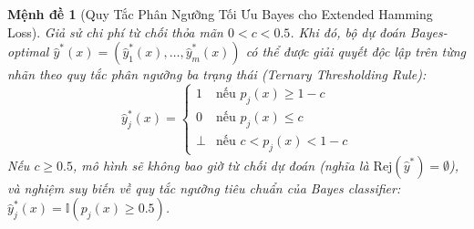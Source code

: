 \documentclass[11pt,a4paper]{article}
\newtheorem{proposition}{Mệnh đề}[section]
\begin{document}
\begin{proposition}[Quy Tắc Phân Ngưỡng Tối Ưu Bayes cho Extended Hamming Loss]
\label{prop:bop_hamming_sep}
Giả sử chi phí từ chối thỏa mãn $0 < c < 0.5$. Khi đó, bộ dự đoán Bayes-optimal $\hat{y}^*(x) = (\hat{y}_1^*(x), \dots, \hat{y}_m^*(x))$ có thể được giải quyết độc lập trên từng nhãn theo quy tắc phân ngưỡng ba trạng thái (Ternary Thresholding Rule):
\begin{equation}
\hat{y}_j^*(x) = 
\begin{cases}
1 & \text{nếu } p_j(x) \ge 1 - c \\
0 & \text{nếu } p_j(x) \le c \\
\bot & \text{nếu } c < p_j(x) < 1 - c
\end{cases}
\label{eq:bop_hamming_ternary}
\end{equation}
Nếu $c \ge 0.5$, mô hình sẽ không bao giờ từ chối dự đoán (nghĩa là $\mathrm{Rej}(\hat{y}^*) = \emptyset$), và nghiệm suy biến về quy tắc ngưỡng tiêu chuẩn của Bayes classifier: $\hat{y}_j^*(x) = \mathbb{I}(p_j(x) \ge 0.5)$.
\end{proposition}
\end{document}

